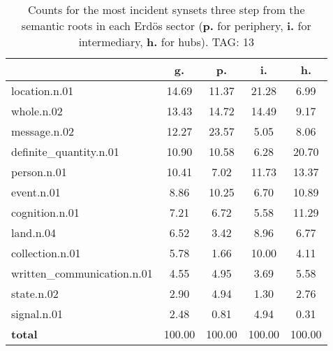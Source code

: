 \begin{table}[h!]
\begin{center}
\begin{tabular}{| l | c | c | c | c |}\hline
 & g. & p. & i. & h. \\\hline
location.n.01 & 14.69  & 11.37  & 21.28  & 6.99 \\\hline
whole.n.02 & 13.43  & 14.72  & 14.49  & 9.17 \\\hline
message.n.02 & 12.27  & 23.57  & 5.05  & 8.06 \\\hline
definite\_quantity.n.01 & 10.90  & 10.58  & 6.28  & 20.70 \\\hline
person.n.01 & 10.41  & 7.02  & 11.73  & 13.37 \\\hline
event.n.01 & 8.86  & 10.25  & 6.70  & 10.89 \\\hline
cognition.n.01 & 7.21  & 6.72  & 5.58  & 11.29 \\\hline
land.n.04 & 6.52  & 3.42  & 8.96  & 6.77 \\\hline
collection.n.01 & 5.78  & 1.66  & 10.00  & 4.11 \\\hline
written\_communication.n.01 & 4.55  & 4.95  & 3.69  & 5.58 \\\hline
state.n.02 & 2.90  & 4.94  & 1.30  & 2.76 \\\hline
signal.n.01 & 2.48  & 0.81  & 4.94  & 0.31 \\\hline
{{\bf total}} & 100.00  & 100.00  & 100.00  & 100.00 \\\hline
\end{tabular}
\caption{Counts for the most incident synsets three step from the semantic roots in each Erd\"os sector ({\bf p.} for periphery, {\bf i.} for intermediary, {\bf h.} for hubs). TAG: 13}
\end{center}
\end{table}